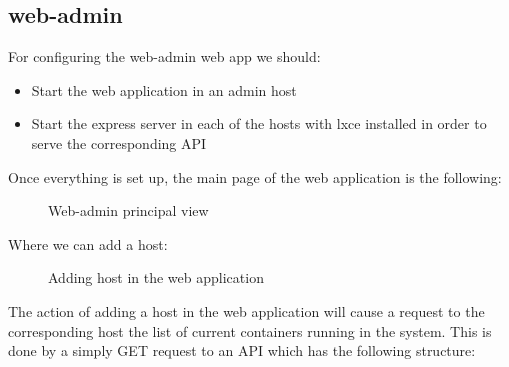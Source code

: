 \subsection{web-admin}
For configuring the web-admin web app we should:
\begin{itemize}
	\item{Start the web application in an admin host}
	\item{Start the express server in each of the hosts with lxce installed in order to serve the corresponding API}
\end{itemize}

Once everything is set up, the main page of the web application is the following:
\begin{figure}[H]
\label{fig:web-admin}
\centering
{}
\caption[web-admin host view]{\footnotesize{Web-admin principal view}}
\end{figure}

Where we can add a host:
\begin{figure}[H]
\label{fig:lxce list}
\centering
{}
\caption[web-admin add host]{\footnotesize{Adding host in the web application}}
\end{figure}

The action of adding a host in the web application will cause a request to the corresponding host the list of current containers running in the system. This is done by a simply GET request to an API which has the following structure:

